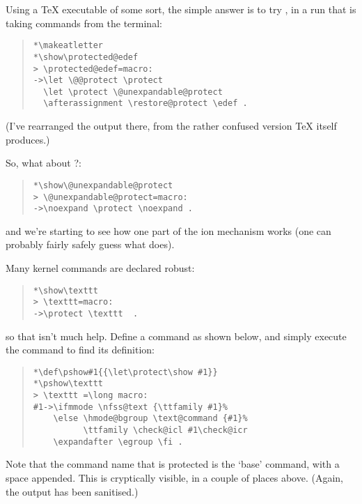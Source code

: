 Using a \TeX{} executable of some sort, the simple answer is to try
, in a run that is taking commands from the terminal:
\begin{quote}
\begin{verbatim}
*\makeatletter
*\show\protected@edef
> \protected@edef=macro:
->\let \@@protect \protect
  \let \protect \@unexpandable@protect
  \afterassignment \restore@protect \edef .
\end{verbatim}
\end{quote}
(I've rearranged the output there, from the rather confused version
\TeX{} itself produces.)

So, what about ?:
\begin{quote}
\begin{verbatim}
*\show\@unexpandable@protect
> \@unexpandable@protect=macro:
->\noexpand \protect \noexpand .
\end{verbatim}
\end{quote}
and we're starting to see how one part of the ion
mechanism works (one can probably fairly safely guess what
 does).

Many kernel commands are declared robust:
\begin{quote}
\begin{verbatim}
*\show\texttt
> \texttt=macro:
->\protect \texttt  .
\end{verbatim}
\end{quote}
so that  isn't much help.  Define a command  as
shown below, and simply execute the command to find its definition:
\begin{quote}
\begin{verbatim}
*\def\pshow#1{{\let\protect\show #1}}
*\pshow\texttt
> \texttt =\long macro:
#1->\ifmmode \nfss@text {\ttfamily #1}%
    \else \hmode@bgroup \text@command {#1}%
          \ttfamily \check@icl #1\check@icr
    \expandafter \egroup \fi .
\end{verbatim}
\end{quote}
Note that the command name that is protected is the `base' command,
with a space appended.  This is cryptically visible, in a couple of
places above.  (Again, the output has been sanitised.)


